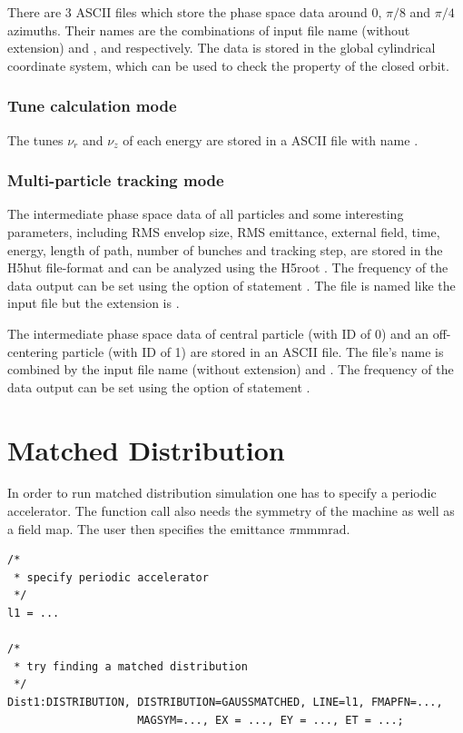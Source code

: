 There are 3 ASCII files which store the phase space data around $0$, $\pi/8$ and $\pi/4$ azimuths.
Their names are the combinations of input file name (without extension) and ,  and  respectively.
The data is stored in the global cylindrical coordinate system, which can be used to check the property of the closed orbit.

\subsubsection{Tune calculation mode}

 The tunes $\nu_r$ and $\nu_z$ of each energy are stored in a ASCII file with name .

\subsubsection{Multi-particle tracking mode}

The intermediate phase space data of all particles and some interesting parameters,
including RMS envelop size, RMS emittance, external field, time, energy, length of path, number of bunches and
tracking step, are stored in the H5hut file-format \cite{bib:howison2010} and can be analyzed
using the H5root \cite{bib:schietinger}.
The frequency of the data output can be set using the   option of  statement .
The file is named like the input file but the extension is .

The intermediate phase space data of central particle (with ID of 0) and an off-centering particle (with ID of 1)
are stored in an ASCII file. The file's name is combined by the input file name (without extension) and .
The frequency of the data output can be set using the  option of  statement .



\section{Matched Distribution}
In order to run matched distribution simulation one has to specify a periodic accelerator. The function call also needs
the symmetry of the machine as well as a field map. The user then specifies the emittance $\pi\si{\milli\meter\milli\radian}$.
\begin{verbatim}
/*
 * specify periodic accelerator
 */
l1 = ...

/*
 * try finding a matched distribution
 */
Dist1:DISTRIBUTION, DISTRIBUTION=GAUSSMATCHED, LINE=l1, FMAPFN=...,
                    MAGSYM=..., EX = ..., EY = ..., ET = ...;
\end{verbatim}
